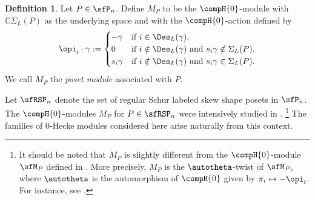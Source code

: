 \documentclass[12pt, reqno]{amsart}
\theoremstyle{plain}
\theoremstyle{definition}
\newtheorem{definition}[definition]{Definition}
\numberwithin{equation}{section}
\numberwithin{figure}{section}
\numberwithin{table}{section}
\def\C{\mathbb C}
\begin{document}
\begin{definition}\label{def: poset modules}
Let $P \in \sfP_n$.
Define $M_P$ to be the $\compH{0}$-module with $\C \Sigma_{L}(P)$ as the underlying space and with the $\compH{0}$-action defined by
\begin{align*}
\opi_{i} \cdot \gamma :=
\begin{cases}
-\gamma & \text{if $i \in \Des_L(\gamma)$}, \\
0 & \text{if $i \notin \Des_L(\gamma)$ and $s_i\gamma \notin \Sigma_{L}(P)$,} \\
s_i \gamma & \text{if $i \notin \Des_L(\gamma)$ and $s_i\gamma \in \Sigma_{L}(P)$}.
\end{cases} 
\end{align*}
We call $M_P$ the \emph{poset module} associated with $P$.
\end{definition}



Let $\sfRSP_n$ denote the set of regular Schur labeled skew shape posets in $\sfP_n$.
The $\compH{0}$-modules $M_P$
for $P \in \sfRSP_n$
were intensively studied in \cite{23KLO}.
\footnote{It should be noted that $M_P$ is slightly different from the $\compH{0}$-module $\sfM_P$ defined in \cite[Definition 2.8]{23KLO}. 
More precisely, $M_P$ is the $\autotheta$-twist of $\sfM_P$, where $\autotheta$ is the automorphism of $\compH{0}$ given by $\pi_i \mapsto -\opi_i$.
For instance, see \cite[Theorem 3.6(a)]{23CKO}.
}
The families of $0$-Hecke modules considered here arise naturally from this context. 
\end{document}
